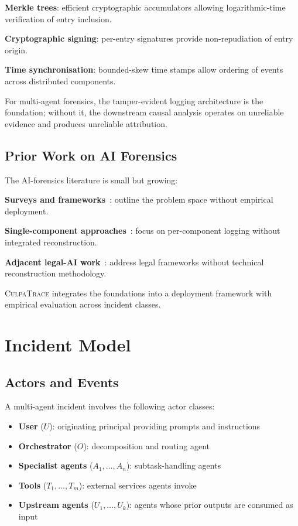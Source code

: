 \documentclass[sigconf,nonacm]{acmart}
\begin{document}
\textbf{Merkle trees}: efficient cryptographic accumulators
allowing logarithmic-time verification of entry inclusion.

\textbf{Cryptographic signing}: per-entry signatures provide
non-repudiation of entry origin.

\textbf{Time synchronisation}: bounded-skew time stamps allow
ordering of events across distributed components.

For multi-agent forensics, the tamper-evident logging architecture
is the foundation; without it, the downstream causal analysis
operates on unreliable evidence and produces unreliable
attribution.

\subsection{Prior Work on AI Forensics}

The AI-forensics literature is small but growing:

\textbf{Surveys and frameworks}~\cite{li2024aiforensics,
nist2024aiforensics}: outline the problem space without empirical
deployment.

\textbf{Single-component approaches}~\cite{wang2024agentlogging}:
focus on per-component logging without integrated reconstruction.

\textbf{Adjacent legal-AI work}~\cite{chen2024ailiability,
sundararajan2024algorithmaccountability}: address legal frameworks
without technical reconstruction methodology.

\textsc{CulpaTrace} integrates the foundations into a deployment
framework with empirical evaluation across incident classes.

\section{Incident Model}

\subsection{Actors and Events}

A multi-agent incident involves the following actor classes:

\begin{itemize}
  \item \textbf{User} ($U$): originating principal providing
        prompts and instructions
  \item \textbf{Orchestrator} ($O$): decomposition and routing
        agent
  \item \textbf{Specialist agents} ($A_1, \ldots, A_n$):
        subtask-handling agents
  \item \textbf{Tools} ($T_1, \ldots, T_m$): external services
        agents invoke
  \item \textbf{Upstream agents} ($U_1, \ldots, U_k$): agents
        whose prior outputs are consumed as input
\end{itemize}
\end{document}
